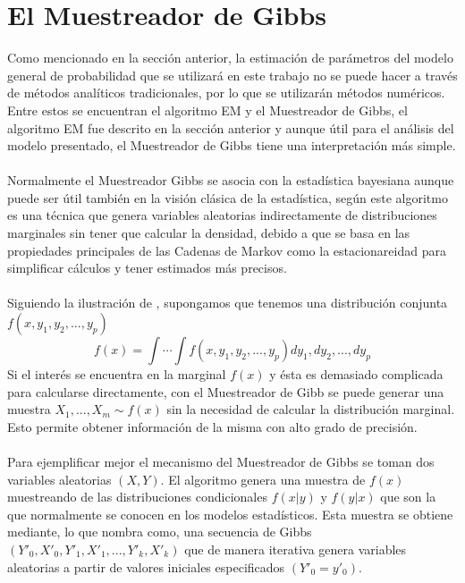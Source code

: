 \section{El Muestreador de Gibbs}
Como mencionado en la secci\'on anterior, la estimaci\'on de par\'ametros del modelo general de probabilidad que se utilizar\'a en este trabajo no se puede hacer a trav\'es de m\'etodos anal\'iticos tradicionales, por lo que se utilizar\'an m\'etodos num\'ericos. Entre estos se encuentran el algoritmo EM y el Muestreador de Gibbs, el algoritmo EM fue descrito en la secci\'on anterior y aunque \'util para el an\'alisis del modelo presentado, el Muestreador de Gibbs tiene una interpretaci\'on m\'as simple.\\
\\
Normalmente el Muestreador Gibbs se asocia con la estad\'istica bayesiana aunque puede ser \'util tambi\'en en la visi\'on cl\'asica de la estad\'istica, seg\'un \cite{casella1992explaining} este algoritmo es una t\'ecnica que genera variables aleatorias indirectamente de distribuciones marginales sin tener que calcular la densidad, debido a que se basa en las propiedades principales de las Cadenas de Markov como la estacionareidad para simplificar c\'alculos y tener estimados m\'as precisos.\\
\\
Siguiendo la ilustraci\'on de \cite{casella1992explaining}, supongamos que tenemos una distribuci\'on conjunta $f(x,y_1,y_2,...,y_p)$\\
\[f(x)=\int \cdots \int f(x,y_1,y_2,...,y_p) dy_1,dy_2,...,dy_p\]
Si el inter\'es se encuentra en la marginal $f(x)$ y \'esta es demasiado complicada para calcularse directamente, con el Muestreador de Gibb se puede generar una muestra $X_1,...,X_m \sim f(x)$ sin la necesidad de calcular la distribuci\'on marginal. Esto permite obtener informaci\'on de la misma con alto grado de precisi\'on.\\
\\
Para ejemplificar mejor el mecanismo del Muestreador de Gibbs se toman dos variables aleatorias $(X,Y)$. El algoritmo genera una muestra de $f(x)$ muestreando de las distribuciones condicionales $f(x|y)$ y $f(y|x)$ que son la que normalmente se conocen en los modelos estad\'isticos. Esta muestra se obtiene mediante, lo que \cite{casella1992explaining} nombra como, una secuencia de Gibbs $(Y'_0,X'_0,Y'_1,X'_1,...,Y'_k,X'_k)$ que de manera iterativa genera variables aleatorias a partir de valores iniciales especificados $(Y'_0=y'_0)$.\\
